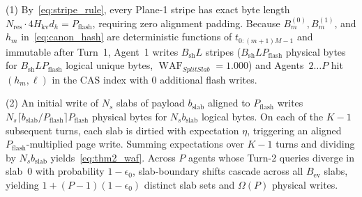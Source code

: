 \documentclass[10pt,journal,compsoc]{IEEEtran}
\theoremstyle{definition}
\theoremstyle{remark}
\newcommand{\SplitSlab}{\textup{\textsc{SplitSlab}}}
\newcommand{\WAF}{\operatorname{WAF}}
\def\SplitSlab{SplitSlab}%
\begin{document}
\begin{IEEEproof}
(1) By~\eqref{eq:stripe_rule}, every Plane-1 stripe has exact byte length $N_{\mathrm{res}} \cdot 4 H_{\mathrm{kv}} d_h = P_{\mathrm{flash}}$, requiring zero alignment padding. Because $B_m^{(0)}, B_m^{(1)}$, and $h_m$ in~\eqref{eq:canon_hash} are deterministic functions of $t_{0:(m+1)M-1}$ and immutable after Turn~1, Agent~1 writes $B_{\mathrm{sh}} L$ stripes ($B_{\mathrm{sh}} L P_{\mathrm{flash}}$ physical bytes for $B_{\mathrm{sh}} L P_{\mathrm{flash}}$ logical unique bytes, $\WAF_{\SplitSlab} = 1.000$) and Agents~$2\dots P$ hit $(h_m,\ell)$ in the CAS index with $0$ additional flash writes.

(2) An initial write of $N_s$ slabs of payload $b_{\mathrm{slab}}$ aligned to $P_{\mathrm{flash}}$ writes $N_s \lceil b_{\mathrm{slab}}/P_{\mathrm{flash}}\rceil P_{\mathrm{flash}}$ physical bytes for $N_s b_{\mathrm{slab}}$ logical bytes. On each of the $K-1$ subsequent turns, each slab is dirtied with expectation $\eta$, triggering an aligned $P_{\mathrm{flash}}$-multiplied page write. Summing expectations over $K-1$ turns and dividing by $N_s b_{\mathrm{slab}}$ yields~\eqref{eq:thm2_waf}. Across $P$ agents whose Turn-2 queries diverge in slab~$0$ with probability $1 - \epsilon_0$, slab-boundary shifts cascade across all $B_{\mathrm{ev}}$ slabs, yielding $1 + (P-1)(1-\epsilon_0)$ distinct slab sets and $\Omega(P)$ physical writes.
\end{IEEEproof}



\end{document}
